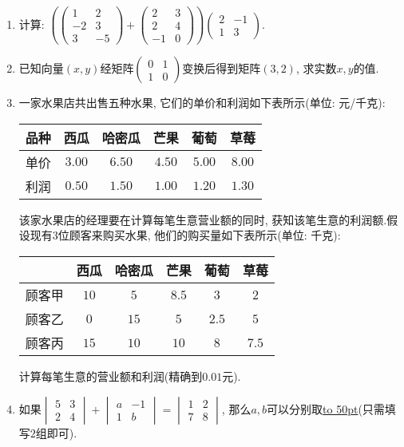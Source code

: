 \documentclass[10pt,a4paper]{article}
\newcommand{\blank}[1]{\underline{\hbox to #1pt{}}}
\begin{document}
\begin{enumerate}[1.]
\item 计算: $(\begin{pmatrix} 1 & 2  \\-2 & 3  \\3 & -5  \end{pmatrix}+\begin{pmatrix}  2 & 3  \\2 & 4  \\-1 & 0  \end{pmatrix})\begin{pmatrix} 2 & -1  \\1 & 3  \end{pmatrix}$.
\item 已知向量$(x,y)$经矩阵$\begin{pmatrix}
0 & 1  \\1 & 0  \end{pmatrix}$变换后得到矩阵$(3,2)$, 求实数$x,y$的值.
\item 一家水果店共出售五种水果, 它们的单价和利润如下表所示(单位: 元/千克):
\begin{center}
    \begin{tabular}{|c|c|c|c|c|c|}
        \hline
        品种 & 西瓜 & 哈密瓜 & 芒果 & 葡萄 & 草莓 \\ \hline
        单价 & $3.00$ & $6.50$ & $4.50$ & $5.00$ & $8.00$\\ \hline
        利润 & $0.50$ & $1.50$ & $1.00$ & $1.20$ & $1.30$\\ \hline
    \end{tabular}
\end{center}
该家水果店的经理要在计算每笔生意营业额的同时, 获知该笔生意的利润额.假设现有$3$位顾客来购买水果, 他们的购买量如下表所示(单位: 千克):
\begin{center}
    \begin{tabular}{|c|c|c|c|c|c|}
        \hline
         & 西瓜 & 哈密瓜 & 芒果 & 葡萄 & 草莓\\ \hline
        顾客甲 & $10$ & $5$ & $8.5$ & $3$ & $2$\\ \hline
        顾客乙 & $0$ & $15$ & $5$ & $2.5$ & $5$\\ \hline
        顾客丙 & $15$ & $10$ & $10$ & $8$ & $7.5$\\ \hline
    \end{tabular}
\end{center}
计算每笔生意的营业额和利润(精确到$0.01$元).
\item 如果$\begin{vmatrix}    5 & 3  \\2 & 4  \end{vmatrix}+\begin{vmatrix}    a & -1  \\1 & b  \end{vmatrix}=\begin{vmatrix}    1 & 2  \\7 & 8  \end{vmatrix}$, 那么$a,b$可以分别取\blank{50}(只需填写$2$组即可).

\end{enumerate}
\end{document}
